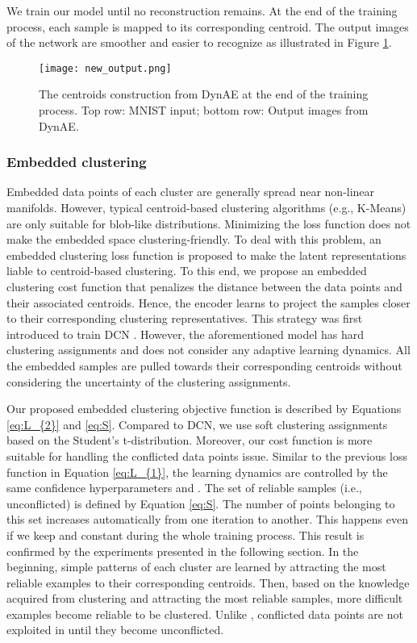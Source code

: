 \documentclass{article}
\begin{document}
We train our model until no reconstruction remains. At the end of the training process, each sample is mapped to its corresponding centroid. The output images of the network are smoother and easier to recognize as illustrated in Figure \ref{fig:new_output}.

\begin{figure}[ht]
\vskip 0.2in
\begin{center}
\centerline{\texttt{[image: new\_output.png]}}
\caption{The centroids construction from DynAE at the end of the training process. Top row: MNIST input; bottom row: Output images from DynAE.}
\label{fig:new_output}
\end{center}
\vskip -0.2in
\end{figure}

\subsubsection{Embedded clustering}

Embedded data points of each cluster are generally spread near non-linear manifolds. However, typical centroid-based clustering algorithms (e.g., K-Means) are only suitable for blob-like distributions. Minimizing the  loss function does not make the embedded space clustering-friendly. To deal with this problem, an embedded clustering loss function  is proposed to make the latent representations liable to centroid-based clustering. To this end, we propose an embedded clustering cost function that penalizes the distance between the data points and their associated centroids. Hence, the encoder learns to project the samples closer to their corresponding clustering representatives. This strategy was first introduced to train DCN \cite{paper29}. However, the aforementioned model has hard clustering assignments and does not consider any adaptive learning dynamics. All the embedded samples are pulled towards their corresponding centroids without considering the uncertainty of the clustering assignments. 

Our proposed embedded clustering objective function is described by Equations \ref{eq:L_{2}} and \ref{eq:S}.  Compared to DCN, we use soft clustering assignments based on the Student’s t-distribution. Moreover, our cost function is more suitable for handling the conflicted data points issue. Similar to the previous loss function in Equation \ref{eq:L_{1}}, the learning dynamics are controlled by the same confidence hyperparameters  and . The set of reliable samples (i.e., unconflicted) is defined by Equation \ref{eq:S}. The number of points belonging to this set increases automatically from one iteration to another. This happens even if we keep   and  constant during the whole training process. This result is confirmed by the experiments presented in the following section. In the beginning, simple patterns of each cluster are learned by attracting the most reliable examples to their corresponding centroids. Then, based on the knowledge acquired from clustering and attracting the most reliable samples, more difficult examples become reliable to be clustered. Unlike , conflicted data points are not exploited in  until they become unconflicted. 
\end{document}
